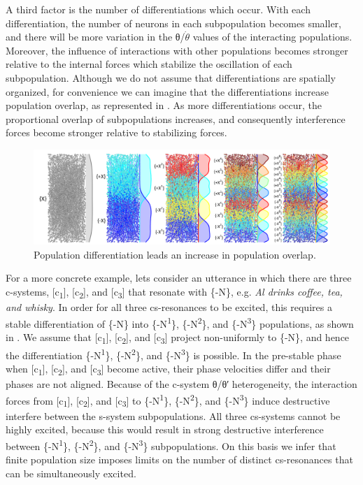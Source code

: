   A third factor is the number of differentiations which occur. With each differentiation, the number of neurons in each subpopulation becomes smaller, and there will be more variation in the θ/$\dot{\theta}$ values of the interacting populations. Moreover, the influence of interactions with other populations becomes stronger relative to the internal forces which stabilize the oscillation of each subpopulation.  Although we do not assume that differentiations are spatially organized, for convenience we can imagine that the differentiations increase population overlap, as represented in {}. As more differentiations occur, the proportional overlap of subpopulations increases, and consequently interference forces become stronger relative to stabilizing forces.

  
\begin{figure}
\includegraphics[width=\textwidth]{figures/Tilsen-img91.png}
\caption{Population differentiation leads an increase in population overlap.}
\label{fig:4:41}
\end{figure}
 

  For a more concrete example, lets consider an utterance in which there are three c-systems, [c\textsubscript{1}], [c\textsubscript{2}], and [c\textsubscript{3}] that resonate with \{-N\}, e.g. \textit{Al drinks coffee, tea, and whisky}. In order for all three cs-resonances to be excited, this requires a stable differentiation of \{-N\} into \{-N\textsuperscript{1}\}, \{-N\textsuperscript{2}\}, and \{-N\textsuperscript{3}\} populations, as shown in {}. We assume that [c\textsubscript{1}], [c\textsubscript{2}], and [c\textsubscript{3}] project non-uniformly to \{-N\}, and hence the differentiation \{-N\textsuperscript{1}\}, \{-N\textsuperscript{2}\}, and \{-N\textsuperscript{3}\} is possible. In the pre-stable phase when [c\textsubscript{1}], [c\textsubscript{2}], and [c\textsubscript{3}] become active, their phase velocities differ and their phases are not aligned. Because of the c-system θ/θ′ heterogeneity, the interaction forces from [c\textsubscript{1}], [c\textsubscript{2}], and [c\textsubscript{3}] to \{-N\textsuperscript{1}\}, \{-N\textsuperscript{2}\}, and \{-N\textsuperscript{3}\} induce destructive interfere between the s-system subpopulations. All three cs-systems cannot be highly excited, because this would result in strong destructive interference between \{-N\textsuperscript{1}\}, \{-N\textsuperscript{2}\}, and \{-N\textsuperscript{3}\} subpopulations. On this basis we infer that finite population size imposes limits on the number of distinct cs-resonances that can be simultaneously excited.

